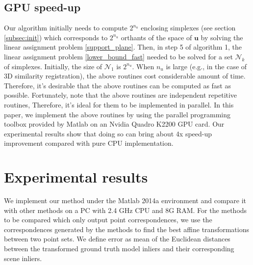 \documentclass[11pt,bezier,]{article}
\begin{document}
\subsection{GPU speed-up}
Our algorithm  initially needs to compute $2^{n_u}$ enclosing simplexes (see section \ref{subsec:init})
which corresponds to $2^{n_u}$ orthants of the space of $\mathbf u$
by solving the linear assignment problem \eqref{support_plane}.
Then, in step 5 of  algorithm 1,
the linear assignment problem \eqref{lower_bound_fast} needed to be solved for a set $\mathscr N_k$ of simplexes.
Initially, the size of $\mathscr N_1$ is  $2^{n_u}$.
When $n_u$ is large
(e.g., in the case of 3D similarity registration),
the above routines cost considerable amount of time.
Therefore, 
it's desirable that the above routines can be computed as fast as possible.
Fortunately,
note that the above routines are  independent repetitive routines,
Therefore,
it's ideal for them to be implemented in parallel.
In this paper,
we implement the above routines by using the parallel programming toolbox provided by Matlab
on an Nvidia Quadro K2200 GPU  card.
Our experimental results show that doing so can bring about 4x speed-up improvement
compared with pure CPU implementation.




\section{Experimental results\label{sec:exp}}

We implement our method under the Matlab 2014a environment
and compare it with other methods  on a PC with 2.4 GHz CPU and 8G RAM.
For  the methods to be compared which only output point correspondences,
we use the correspondences generated  by the methods 
to find the best affine transformations between  two point sets.
We define error  as  mean of the Euclidean distances 
between the transformed ground truth model inliers and their corresponding scene inliers.


\end{document}
